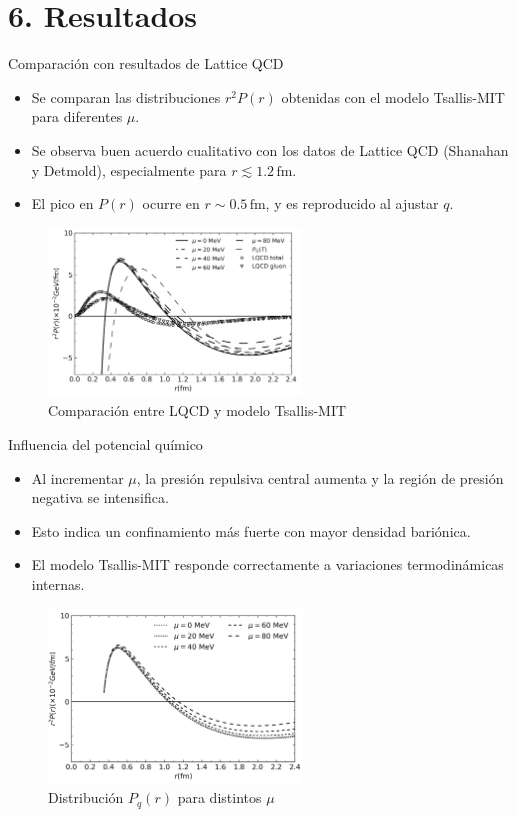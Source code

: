 \documentclass{beamer}
\begin{document}
\section[Resultados]{6. Resultados}
\begin{frame}{Comparación con resultados de Lattice QCD}
  \begin{itemize}
    \item Se comparan las distribuciones \( r^2 P(r) \) obtenidas con el modelo Tsallis-MIT para diferentes \( \mu \).
    \item Se observa buen acuerdo cualitativo con los datos de Lattice QCD (Shanahan y Detmold), especialmente para \( r \lesssim 1.2 \, \text{fm} \).
    \item El pico en \( P(r) \) ocurre en \( r \sim 0.5 \, \text{fm} \), y es reproducido al ajustar \( q \).
  \end{itemize}
  \begin{figure}
    \includegraphics[width=0.6\textwidth]{figures/LQCD_vs_TsallisMIT.png} %
    \caption{Comparación entre LQCD y modelo Tsallis-MIT}
  \end{figure}
\end{frame}

\begin{frame}{Influencia del potencial químico}
  \begin{itemize}
    \item Al incrementar \( \mu \), la presión repulsiva central aumenta y la región de presión negativa se intensifica.
    \item Esto indica un confinamiento más fuerte con mayor densidad bariónica.
    \item El modelo Tsallis-MIT responde correctamente a variaciones termodinámicas internas.
  \end{itemize}
  \begin{figure}
    \includegraphics[width=0.6\textwidth]{figures/Pressure_mu_variation.png}
    \caption{Distribución \( P_q(r) \) para distintos \( \mu \)}
  \end{figure}
\end{frame}
\end{document}
